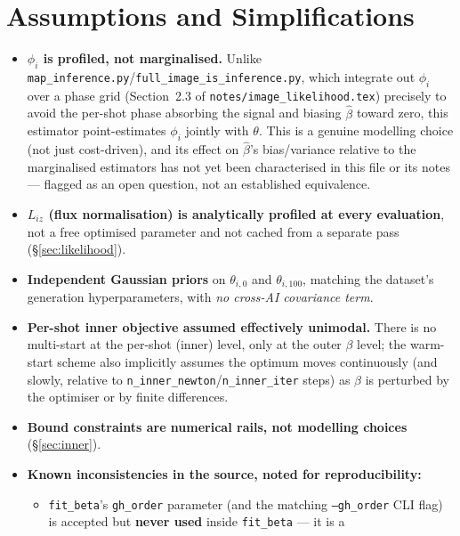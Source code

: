 \documentclass[11pt,a4paper]{article}
\newcommand{\code}[1]{\texttt{#1}}
\begin{document}
\section{Assumptions and Simplifications}
\label{sec:assumptions}

\begin{itemize}
  \item \textbf{$\phi_i$ is profiled, not marginalised.} Unlike
    \code{map\_inference.py}/\code{full\_image\_is\_inference.py}, which
    integrate out $\phi_i$ over a phase grid (Section~2.3 of
    \code{notes/image\_likelihood.tex}) precisely to avoid the per-shot
    phase absorbing the signal and biasing $\hat\beta$ toward zero, this
    estimator point-estimates $\phi_i$ jointly with $\theta$. This is a
    genuine modelling choice (not just cost-driven), and its effect on
    $\hat\beta$'s bias/variance relative to the marginalised estimators has
    not yet been characterised in this file or its notes --- flagged as an
    open question, not an established equivalence.
  \item \textbf{$L_{iz}$ (flux normalisation) is analytically profiled at
    every evaluation}, not a free optimised parameter and not cached from
    a separate pass (\S\ref{sec:likelihood}).
  \item \textbf{Independent Gaussian priors} on $\theta_{i,0}$ and
    $\theta_{i,100}$, matching the dataset's generation hyperparameters,
    with \emph{no cross-AI covariance term}.
  \item \textbf{Per-shot inner objective assumed effectively unimodal.}
    There is no multi-start at the per-shot (inner) level, only at the
    outer $\beta$ level; the warm-start scheme also implicitly assumes the
    optimum moves continuously (and slowly, relative to
    \code{n\_inner\_newton}/\code{n\_inner\_iter} steps) as $\beta$ is
    perturbed by the optimiser or by finite differences.
  \item \textbf{Bound constraints are numerical rails, not modelling
    choices} (\S\ref{sec:inner}).
  \item \textbf{Known inconsistencies in the source, noted for
    reproducibility:}
    \begin{itemize}
      \item \code{fit\_beta}'s \code{gh\_order} parameter (and the
        matching \code{--gh\_order} CLI flag) is accepted but
        \textbf{never used} inside \code{fit\_beta} --- it is a

\end{itemize}
\end{itemize}
\end{document}
